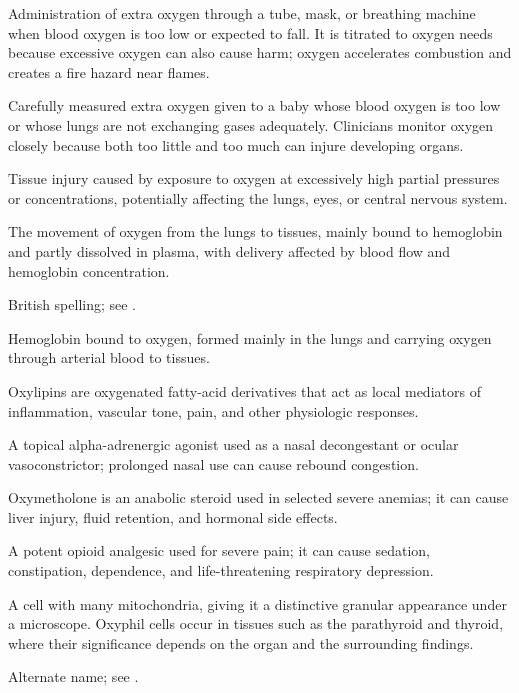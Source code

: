  Administration of extra oxygen through a tube, mask, or breathing machine when blood oxygen is too low or expected to fall. It is titrated to oxygen needs because excessive oxygen can also cause harm; oxygen accelerates combustion and creates a fire hazard near flames.

 Carefully measured extra oxygen given to a baby whose blood oxygen is too low or whose lungs are not exchanging gases adequately. Clinicians monitor oxygen closely because both too little and too much can injure developing organs.

 Tissue injury caused by exposure to oxygen at excessively high partial pressures or concentrations, potentially affecting the lungs, eyes, or central nervous system.

 The movement of oxygen from the lungs to tissues, mainly bound to hemoglobin and partly dissolved in plasma, with delivery affected by blood flow and hemoglobin concentration.

 British spelling; see .

 Hemoglobin bound to oxygen, formed mainly in the lungs and carrying oxygen through arterial blood to tissues.

 Oxylipins are oxygenated fatty-acid derivatives that act as local mediators of inflammation, vascular tone, pain, and other physiologic responses.

 A topical alpha-adrenergic agonist used as a nasal decongestant or ocular vasoconstrictor; prolonged nasal use can cause rebound congestion.

 Oxymetholone is an anabolic steroid used in selected severe anemias; it can cause liver injury, fluid retention, and hormonal side effects.

 A potent opioid analgesic used for severe pain; it can cause sedation, constipation, dependence, and life-threatening respiratory depression.

 A cell with many mitochondria, giving it a distinctive granular appearance under a microscope. Oxyphil cells occur in tissues such as the parathyroid and thyroid, where their significance depends on the organ and the surrounding findings.

 Alternate name; see .


